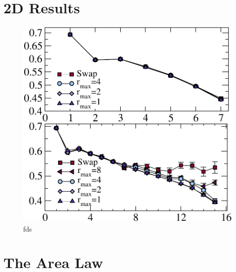 
\section{2D Results}

\begin{figure} {
	\includegraphics[width=5in]{./figures/paper2/fig_2DA/fig_L8n16.pdf} 
	\centering
	\caption[fds]{ fds
	\label{2Dfig}
	}
} \end{figure}

\section{The Area Law}

